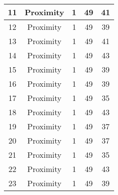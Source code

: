 \documentclass[results.tex]{subfiles}
\begin{document}
\begin{center}
\begin{tabular}{| c || c | c | c | c |}
            \hline
            11                      & Proximity                    & 1                      & 49                      & 41                   \\
            \hline
            12                      & Proximity                    & 1                      & 49                      & 39                   \\
            \hline
            13                      & Proximity                    & 1                      & 49                      & 41                   \\
            \hline
            14                      & Proximity                    & 1                      & 49                      & 43                   \\
            \hline
            15                      & Proximity                    & 1                      & 49                      & 39                   \\
            \hline
            16                      & Proximity                    & 1                      & 49                      & 39                   \\
            \hline
            17                      & Proximity                    & 1                      & 49                      & 35                   \\
            \hline
            18                      & Proximity                    & 1                      & 49                      & 43                   \\
            \hline
            19                      & Proximity                    & 1                      & 49                      & 37                   \\
            \hline
            20                      & Proximity                    & 1                      & 49                      & 37                   \\
            \hline
            21                      & Proximity                    & 1                      & 49                      & 35                   \\
            \hline
            22                      & Proximity                    & 1                      & 49                      & 43                   \\
            \hline
            23                      & Proximity                    & 1                      & 49                      & 39                   \\

\end{tabular}
\end{center}
\end{document}
